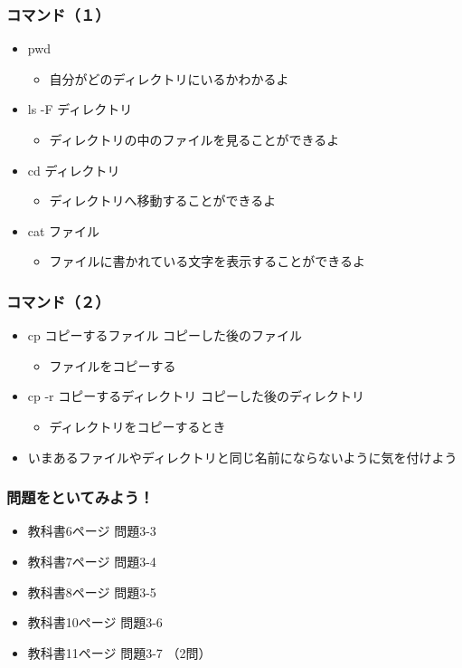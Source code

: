 \begin{frame}
    \frametitle{コマンド（１）}
    \begin{itemize}
        \item pwd
        \begin{itemize}
            \item 自分がどのディレクトリにいるかわかるよ
        \end{itemize}
        \item ls -F ディレクトリ
        \begin{itemize}
            \item ディレクトリの中のファイルを見ることができるよ
        \end{itemize}
        \item cd ディレクトリ
        \begin{itemize}
            \item ディレクトリへ移動することができるよ
        \end{itemize}
        \item cat ファイル
        \begin{itemize}
            \item ファイルに書かれている文字を表示することができるよ
        \end{itemize}
    \end{itemize}
\end{frame}

\begin{frame}
    \frametitle{コマンド（２）}
    \begin{itemize}
        \item cp コピーするファイル コピーした後のファイル
        \begin{itemize}
            \item ファイルをコピーする
        \end{itemize}
        \item cp -r コピーするディレクトリ コピーした後のディレクトリ
        \begin{itemize}
            \item ディレクトリをコピーするとき
        \end{itemize}
        \item いまあるファイルやディレクトリと同じ名前にならないように気を付けよう
    \end{itemize}
\end{frame}

\begin{frame}
    \frametitle{問題をといてみよう！}
    \begin{itemize}
        \item 教科書6ページ 問題3-3
        \item 教科書7ページ 問題3-4
        \item 教科書8ページ 問題3-5
        \item 教科書10ページ 問題3-6
        \item 教科書11ページ 問題3-7 （2問）
    \end{itemize}
\end{frame}

